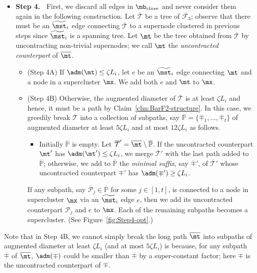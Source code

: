 \begin{itemize}
	\item \textbf{Step 4.~}  First, we discard all edges in $\mb_{close}$ and never consider them again in the following construction. 	Let $\overline{\mathcal{T}}$ be a tree of $\overline{\mathcal{F}_3}$; observe that there must be an $\widetilde{\mst}_i$ edge connecting $\overline{\mathcal{T}}$ to a supernode clustered in previous steps since $\widetilde{\mst}_i$ is a spanning tree. Let $\mt$ be the tree obtained from $\overline{\mathcal{T}}$  by uncontracting non-trivial supernodes; we call $\mt$ the \emph{uncontracted counterpart} of $\overline{\mt}$.
\begin{itemize}
	\item (Step 4A)  If $\adm(\mt)\leq \zeta L_i$, let $e$ be an $\widetilde{\mst}_i$ edge connecting $\mt$  and a node in a supercluster $\mx$. We add both $e$ and $\mt$ to $\mx$. 
	\item (Step 4B) 	Otherwise,  the augmented diameter of $\overline{\mathcal{T}}$ is at least $\zeta L_i$ and hence, it must be a path by Claim~\ref{clm:BarF2-structure}. In this case, we greedily break $\overline{\mathcal{T}}$ into a collection of subpaths, say $\overline{\mathbb{P}} = \{\overline{\mp}_1, \ldots, \overline{\mp}_t\}$ of augmented diameter at least $5\zeta L_i$ and at most $12\zeta L_i$ as follows. 
	\begin{itemize}
		\item[] 	Initially $\overline{\mathbb{P}}$ is empty. Let $\overline{\mathcal{T}}' = \overline{\mt}\setminus \overline{\mathbb{P}}$. If the uncontracted counterpart $\mt'$  has $\adm(\mt') \leq \zeta L_i$, we merge $\overline{\mathcal{T}}'$ with the last path added to $\overline{\mathbb{P}}$; otherwise, we add to $\overline{\mathbb{P}}$ the \emph{ minimal suffix}, say $\overline{\mp}'$, of $\overline{\mathcal{T}}'$ whose  uncontracted counterpart $\mp'$ has $\adm(\mp')\geq \zeta L_i$.  
	\end{itemize}	
   If any subpath, say $\overline{\mathcal{P}}_j \in \overline{\mathbb{P}}$ for some $j\in [1,t]$, is connected to a node in supercluster $\mx$ via an $\widetilde{\mst}_i$ edge $e$, then we add its uncontracted counterpart $\mathcal{P}_j$ and $e$ to $\mx$. Each of the remaining subpaths becomes a supercluster. (See Figure~\ref{fig:Step4-opt}.)
\end{itemize}
\end{itemize}


Note that in Step 4B, we cannot simply break the long path $\overline{\mt}$ into subpaths of augmented diameter at least $\zeta L_i$ (and at most $5\zeta L_i$) is because, for any subpath $\overline{\mp}$ of $\overline{\mt}$, $\adm(\mp) $ could be smaller than $\overline{\mp}$ by a super-constant factor; here $\mp$ is the uncontracted counterpart of $\overline{\mp}$.


